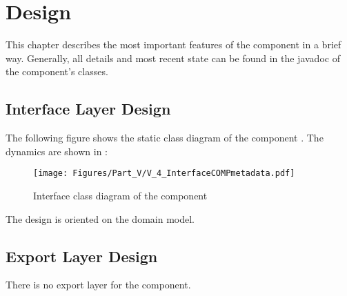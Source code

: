 
\chapter{\COMPmetadata{} Design}
\label{sec:COMPmetadataImplementationDesign}

This chapter describes the most important features of the \COMPmetadata{} component in a brief way. Generally, all details and most recent state can be found in the javadoc of the component's classes.


\section{Interface Layer Design}
\label{sec:InterfaceDesignCOMPmetadata}

The following figure shows the static class diagram of the component \COMPmetadata{}. The dynamics are shown in :

\begin{figure}[H]
	\centering
	\texttt{[image: Figures/Part\_V/V\_4\_InterfaceCOMPmetadata.pdf]}
	\caption{Interface class diagram of the component \COMPmetadata{}}
	\label{fig:V_4_InterfaceCOMPmetadata}
\end{figure}

The design is oriented on the domain model.


\section{Export Layer Design}
\label{sec:ExportDesignCOMPmetadata}

There is no export layer for the \COMPmetadata{} component.


